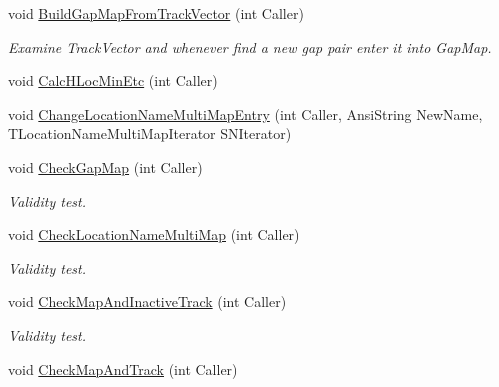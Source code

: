 \begin{DoxyCompactItemize}
\item 
\mbox{\label{class_t_track_a1a3aca3dd4e4bdc7e4c3c254997c2c5a}} 
void \mbox{\hyperlink{class_t_track_a1a3aca3dd4e4bdc7e4c3c254997c2c5a}{Build\+Gap\+Map\+From\+Track\+Vector}} (int Caller)
\begin{DoxyCompactList}\small\item\em Examine Track\+Vector and whenever find a new gap pair enter it into Gap\+Map. \end{DoxyCompactList}\item 
void \mbox{\hyperlink{class_t_track_a20a28eaf0308f7aedcfc78ba9eeadea9}{Calc\+H\+Loc\+Min\+Etc}} (int Caller)
\item 
void \mbox{\hyperlink{class_t_track_aa081ea276995a63dfa00fc0ace24f5c5}{Change\+Location\+Name\+Multi\+Map\+Entry}} (int Caller, Ansi\+String New\+Name, T\+Location\+Name\+Multi\+Map\+Iterator S\+N\+Iterator)
\item 
\mbox{\label{class_t_track_a6c4ff502fade845fc1b9011cc4532e3a}} 
void \mbox{\hyperlink{class_t_track_a6c4ff502fade845fc1b9011cc4532e3a}{Check\+Gap\+Map}} (int Caller)
\begin{DoxyCompactList}\small\item\em Validity test. \end{DoxyCompactList}\item 
\mbox{\label{class_t_track_aaf3f48b8df9877499aaf4c05f804426c}} 
void \mbox{\hyperlink{class_t_track_aaf3f48b8df9877499aaf4c05f804426c}{Check\+Location\+Name\+Multi\+Map}} (int Caller)
\begin{DoxyCompactList}\small\item\em Validity test. \end{DoxyCompactList}\item 
\mbox{\label{class_t_track_a6fa2d4f2c6c94e2c6b4f7218f5356108}} 
void \mbox{\hyperlink{class_t_track_a6fa2d4f2c6c94e2c6b4f7218f5356108}{Check\+Map\+And\+Inactive\+Track}} (int Caller)
\begin{DoxyCompactList}\small\item\em Validity test. \end{DoxyCompactList}\item 
\mbox{\label{class_t_track_a4045fe3f4a71f30a137a7e4581d39231}} 
void \mbox{\hyperlink{class_t_track_a4045fe3f4a71f30a137a7e4581d39231}{Check\+Map\+And\+Track}} (int Caller)

\end{DoxyCompactItemize}
